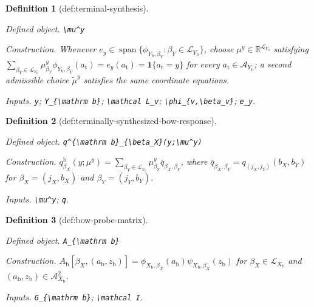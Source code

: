 \documentclass{article}
\newtheorem{definition}{Definition}
\begin{document}
\begin{definition}[def:terminal-synthesis]\label{def:terminal-synthesis}
\par\smallskip\noindent\emph{Defined object.} \texttt{\textbackslash{}\allowbreak{}mu\textasciicircum{}y}
\par\smallskip\noindent\emph{Construction.} Whenever \(e_y\in\operatorname{span}\{\phi_{Y_{\mathrm b},\beta_Y}:\beta_Y\in\mathcal L_{Y_{\mathrm b}}\}\), choose \(\mu^y\in\mathbb R^{\mathcal L_{Y_{\mathrm b}}}\) satisfying \(\sum_{\beta_Y\in\mathcal L_{Y_{\mathrm b}}}\mu^y_{\beta_Y}\phi_{Y_{\mathrm b},\beta_Y}(a_{\mathrm t})=e_y(a_{\mathrm t})=\mathbf 1\{a_{\mathrm t}=y\}\) for every \(a_{\mathrm t}\in\mathcal A_{Y_{\mathrm b}}\); a second admissible choice \(\widetilde\mu^y\) satisfies the same coordinate equations.
\par\smallskip\noindent\emph{Inputs.} \texttt{y}; \texttt{Y\_\allowbreak{}\{\textbackslash{}\allowbreak{}mathrm b\}\allowbreak{}}; \texttt{\textbackslash{}\allowbreak{}mathcal L\_\allowbreak{}v}; \texttt{\textbackslash{}\allowbreak{}phi\_\allowbreak{}\{v,\allowbreak{}\textbackslash{}\allowbreak{}beta\_\allowbreak{}v\}\allowbreak{}}; \texttt{e\_\allowbreak{}y}.
\end{definition}

\begin{definition}[def:terminally-synthesized-bow-response]\label{def:terminally-synthesized-bow-response}
\par\smallskip\noindent\emph{Defined object.} \texttt{q\textasciicircum{}\{\textbackslash{}\allowbreak{}mathrm b\}\allowbreak{}\_\allowbreak{}\{\textbackslash{}\allowbreak{}beta\_\allowbreak{}X\}\allowbreak{}(y;\allowbreak{}\textbackslash{}\allowbreak{}mu\textasciicircum{}y)}
\par\smallskip\noindent\emph{Construction.} \(q^{\mathrm b}_{\beta_X}(y;\mu^y)=\sum_{\beta_Y\in\mathcal L_{Y_{\mathrm b}}}\mu^y_{\beta_Y}\bar q_{\beta_X,\beta_Y}\), where \(\bar q_{\beta_X,\beta_Y}=q_{(j_X,j_Y)}(b_X,b_Y)\) for \(\beta_X=(j_X,b_X)\) and \(\beta_Y=(j_Y,b_Y)\).
\par\smallskip\noindent\emph{Inputs.} \texttt{\textbackslash{}\allowbreak{}mu\textasciicircum{}y}; \texttt{q}.
\end{definition}

\begin{definition}[def:bow-probe-matrix]\label{def:bow-probe-matrix}
\par\smallskip\noindent\emph{Defined object.} \texttt{A\_\allowbreak{}\{\textbackslash{}\allowbreak{}mathrm b\}\allowbreak{}}
\par\smallskip\noindent\emph{Construction.} \(A_{\mathrm b}[\beta_X,(a_{\mathrm b},z_{\mathrm b})]=\phi_{X_{\mathrm b},\beta_X}(a_{\mathrm b})\psi_{X_{\mathrm b},\beta_X}(z_{\mathrm b})\) for \(\beta_X\in\mathcal L_{X_{\mathrm b}}\) and \((a_{\mathrm b},z_{\mathrm b})\in\mathcal A_{X_{\mathrm b}}^2\).
\par\smallskip\noindent\emph{Inputs.} \texttt{G\_\allowbreak{}\{\textbackslash{}\allowbreak{}mathrm b\}\allowbreak{}}; \texttt{\textbackslash{}\allowbreak{}mathcal I}.
\end{definition}
\end{document}
